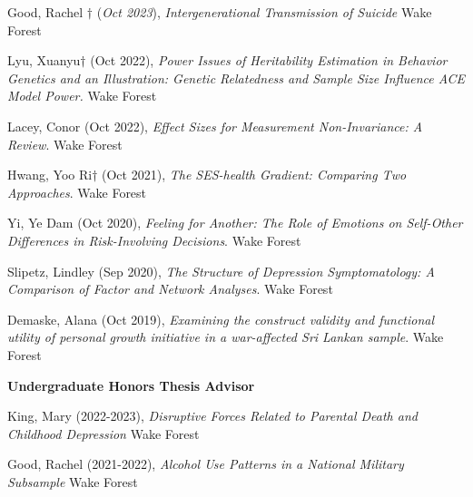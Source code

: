 \begin{etaremune}%
\item  Good, Rachel $\dagger$ (\textit{Oct 2023}), \textit{Intergenerational Transmission of Suicide}  Wake Forest%
\item  Lyu, Xuanyu$\dagger$ (Oct 2022), \textit{Power Issues of Heritability Estimation in Behavior Genetics and an Illustration: Genetic Relatedness and Sample Size Influence ACE Model Power.}  Wake Forest%
\item Lacey, Conor (Oct 2022), \textit{Effect Sizes for Measurement Non-Invariance: A Review}.  Wake Forest%
\item Hwang, Yoo Ri$\dagger$ (Oct 2021), \textit{The SES-health Gradient: Comparing Two Approaches}. Wake Forest%
\item Yi, Ye Dam (Oct 2020), \textit{Feeling for Another: The Role of Emotions on Self-Other Differences in Risk-Involving Decisions}. Wake Forest%
\item Slipetz, Lindley (Sep 2020), \textit{The Structure of Depression Symptomatology: A Comparison of Factor and Network Analyses}. Wake Forest%
\item Demaske, Alana (Oct 2019), \textit{Examining the construct validity and functional utility of personal growth initiative in a war-affected Sri Lankan sample}. Wake Forest%
\end{etaremune}%
%
{\large\textbf{Undergraduate Honors Thesis Advisor}}
\begin{etaremune}%
\item King, Mary (2022-2023), \textit{Disruptive Forces Related to Parental Death and Childhood Depression} Wake Forest%
\item Good, Rachel (2021-2022), \textit{Alcohol Use Patterns in a National Military Subsample} Wake Forest%
\end{etaremune}%


